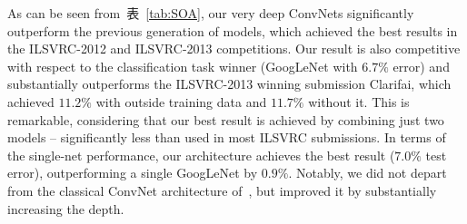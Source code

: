 \documentclass{article} %
\newcommand{\tblref}[1]{表~\ref{#1}}
\begin{document}
As can be seen from~\tblref{tab:SOA}, our very deep \mbox{ConvNets} significantly outperform the previous generation of models, which achieved the best results
in the ILSVRC-2012 and ILSVRC-2013 competitions. Our result is also competitive with respect to the classification task winner (GoogLeNet with $6.7\%$ error) and substantially
outperforms the ILSVRC-2013 winning submission Clarifai, which achieved $11.2\%$ with outside training data and $11.7\%$ without it.
This is remarkable, considering that our best result is achieved by combining just two models -- significantly less than used in most ILSVRC submissions. 
In terms of the single-net performance, our architecture achieves the best result ($7.0\%$ test error), outperforming a single GoogLeNet by $0.9\%$.
Notably, we did not depart from the classical ConvNet architecture of~\citet{LeCun89}, but improved it by substantially increasing the depth.

\end{document}
